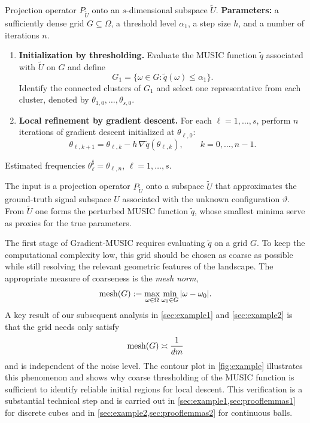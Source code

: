 \documentclass[11pt]{article}
\theoremstyle{definition}
\numberwithin{theorem}{section}
\numberwithin{lemma}{section}
\numberwithin{equation}{section}
\renewcommand{\subset}{\subseteq}
\renewcommand{\tilde}{\widetilde}
\newcommand{\mesh}{{\rm mesh}}
\newcommand{\domain}{\Omega}
\numberwithin{equation}{section}
\begin{document}
\begin{algorithm}[ht]
\caption{Gradient-MUSIC -- coarse thresholding followed by local descent}
\label{alg:gradientMUSIC}
\begin{algorithmic}
\Require Projection operator $P_{\tilde U}$ onto an $s$-dimensional subspace $\tilde U$.
\State \textbf{Parameters:} a sufficiently dense grid $G\subset \domain$, a threshold level $\alpha_1$, a step size $h$, and a number of iterations $n$.
\begin{enumerate}
\item \textbf{Initialization by thresholding.}
Evaluate the MUSIC function $\tilde q$ associated with $\tilde U$ on $G$ and define
\[
G_1=\{\omega\in G:\tilde q(\omega)\le \alpha_1\}.
\]
Identify the connected clusters of $G_1$ and select one representative from each cluster, denoted by $\theta_{1,0},\dots,\theta_{s,0}$.

\item \textbf{Local refinement by gradient descent.}
For each $\ell=1,\dots,s$, perform $n$ iterations of gradient descent initialized at $\theta_{\ell,0}$:
\[
\theta_{\ell,k+1}
=
\theta_{\ell,k}-h\,\nabla \tilde q(\theta_{\ell,k}),
\qquad k=0,\dots,n-1.
\]
\end{enumerate}
\Ensure Estimated frequencies $\theta^\sharp_\ell=\theta_{\ell,n}$, $\ell=1,\dots,s$.
\end{algorithmic}
\end{algorithm}
The input is a projection operator $P_{\tilde U}$ onto a subspace $\tilde U$ that approximates the ground-truth signal subspace $U$ associated with the unknown configuration $\vartheta$. From $\tilde U$ one forms the perturbed MUSIC function $\tilde q$, whose smallest minima serve as proxies for the true parameters. 


The first stage of Gradient-MUSIC requires evaluating $\tilde q$ on a grid $G$. To keep the computational complexity low, this grid should be chosen as coarse as possible while still resolving the relevant geometric features of the landscape. The appropriate measure of coarseness is the \emph{mesh norm},
\begin{equation}
\label{eq:meshG}
\mesh(G)
:=
\max_{\omega\in\domain}\min_{\omega_0\in G} |\omega-\omega_0|.
\end{equation}
{A key result of our subsequent analysis in \cref{sec:example1} and \cref{sec:example2} is that the grid needs only satisfy}
\begin{equation}
\label{eq:meshsize}
\mesh(G)\asymp \frac{1}{dm}
\end{equation}
and is independent of the noise level. The contour plot in \cref{fig:example} illustrates this phenomenon and shows why coarse thresholding of the MUSIC function is sufficient to identify reliable initial regions for local descent.
This verification is a substantial technical step and is carried out in \cref{sec:example1,sec:prooflemmas1} for  discrete cubes and in \cref{sec:example2,sec:prooflemmas2} for continuous balls.
\end{document}
